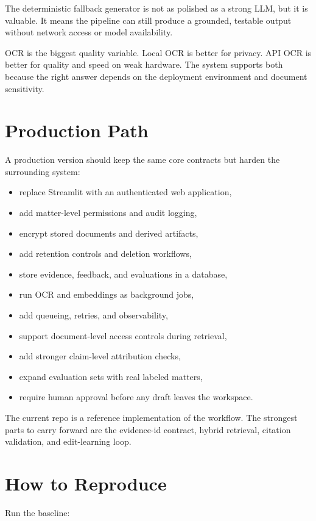 \documentclass[11pt]{article}
\begin{document}
The deterministic fallback generator is not as polished as a strong LLM, but it is valuable. It means the pipeline can still produce a grounded, testable output without network access or model availability.

OCR is the biggest quality variable. Local OCR is better for privacy. API OCR is better for quality and speed on weak hardware. The system supports both because the right answer depends on the deployment environment and document sensitivity.

\section{Production Path}

A production version should keep the same core contracts but harden the surrounding system:

\begin{itemize}
  \item replace Streamlit with an authenticated web application,
  \item add matter-level permissions and audit logging,
  \item encrypt stored documents and derived artifacts,
  \item add retention controls and deletion workflows,
  \item store evidence, feedback, and evaluations in a database,
  \item run OCR and embeddings as background jobs,
  \item add queueing, retries, and observability,
  \item support document-level access controls during retrieval,
  \item add stronger claim-level attribution checks,
  \item expand evaluation sets with real labeled matters,
  \item require human approval before any draft leaves the workspace.
\end{itemize}

The current repo is a reference implementation of the workflow. The strongest parts to carry forward are the evidence-id contract, hybrid retrieval, citation validation, and edit-learning loop.

\section{How to Reproduce}

Run the baseline:
\end{document}
